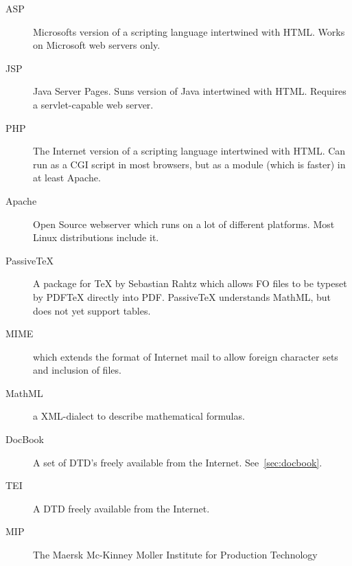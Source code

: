 \begin{description}
\item[ASP] Microsofts version of a scripting language intertwined with
  HTML. Works on Microsoft web servers only.
\item[JSP] Java Server Pages.  Suns version of Java intertwined with
  HTML.  Requires a servlet-capable web server.
\item[PHP] The Internet version of a scripting language intertwined
  with HTML.  Can run as a CGI script in most browsers, but as a
  module (which is faster) in at least Apache.
\item[Apache] Open Source webserver which runs on a lot of different
  platforms.  Most Linux distributions include it.

\item[PassiveTeX] A package for {\TeX} by Sebastian Rahtz which allows
  FO files to be typeset by PDF{\TeX} directly into PDF.  PassiveTeX
  understands MathML, but does not yet support tables.
  
\item[MIME]
   which extends the format of Internet
  mail to allow foreign character sets and inclusion of files.  
  

\item[MathML] a XML-dialect to describe mathematical formulas.


\item[DocBook] A set of DTD's freely available from the Internet.
  See~\vref{sec:docbook}.
\item[TEI] A DTD freely available from the Internet.  
\item[MIP] The Maersk Mc-Kinney Moller Institute for Production Technology

\end{description}

  
    
